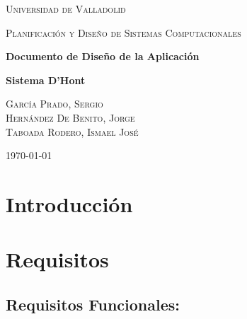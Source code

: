 \documentclass{article}
\begin{document}
	\begin{titlepage}
      \centering
          {\scshape\LARGE Universidad de Valladolid \par}
          \vspace{1cm}
          {\scshape\Large Planificación y Diseño de Sistemas Computacionales\par}
          \vspace{1.5cm}
          {\huge\bfseries Documento de Diseño de la Aplicación\par}
          {\huge\bfseries Sistema D’Hont\par}
          \vspace{2cm}
          {\large
          \textsc{García Prado, Sergio}\\[2mm] %
          \textsc{Hernández De Benito, Jorge}\\[2mm] %
          \textsc{Taboada Rodero, Ismael José}\\[2mm] %
          \vspace{-5mm}
          }

          \vfill
		{\large \today\par}
	\end{titlepage}


	\clearpage
	\tableofcontents


	\clearpage
    \section{Introducción}		

	\clearpage
    \section{Requisitos}
    	
        \subsection{Requisitos Funcionales: }
        
\end{document}
